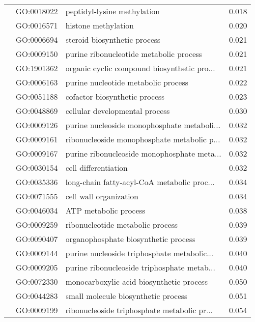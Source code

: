 \begin{longtable}{lllr}
   & GO:0018022 &                  peptidyl-lysine methylation &         0.018 \\
   & GO:0016571 &                          histone methylation &         0.020 \\
   & GO:0006694 &                 steroid biosynthetic process &         0.021 \\
   & GO:0009150 &      purine ribonucleotide metabolic process &         0.021 \\
   & GO:1901362 &  organic cyclic compound biosynthetic pro... &         0.021 \\
   & GO:0006163 &          purine nucleotide metabolic process &         0.022 \\
   & GO:0051188 &                cofactor biosynthetic process &         0.023 \\
   & GO:0048869 &               cellular developmental process &         0.030 \\
   & GO:0009126 &  purine nucleoside monophosphate metaboli... &         0.032 \\
   & GO:0009161 &  ribonucleoside monophosphate metabolic p... &         0.032 \\
   & GO:0009167 &  purine ribonucleoside monophosphate meta... &         0.032 \\
   & GO:0030154 &                         cell differentiation &         0.032 \\
   & GO:0035336 &  long-chain fatty-acyl-CoA metabolic proc... &         0.034 \\
   & GO:0071555 &                       cell wall organization &         0.034 \\
   & GO:0046034 &                        ATP metabolic process &         0.038 \\
   & GO:0009259 &             ribonucleotide metabolic process &         0.039 \\
   & GO:0090407 &         organophosphate biosynthetic process &         0.039 \\
   & GO:0009144 &  purine nucleoside triphosphate metabolic... &         0.040 \\
   & GO:0009205 &  purine ribonucleoside triphosphate metab... &         0.040 \\
   & GO:0072330 &     monocarboxylic acid biosynthetic process &         0.050 \\
   & GO:0044283 &          small molecule biosynthetic process &         0.051 \\
   & GO:0009199 &  ribonucleoside triphosphate metabolic pr... &         0.054 \\

\end{longtable}
